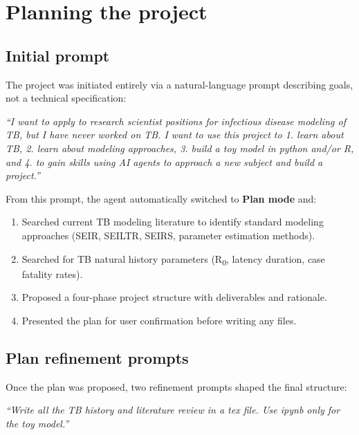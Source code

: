 \documentclass[11pt]{article}
\begin{document}
\section{Planning the project}

\subsection{Initial prompt}

The project was initiated entirely via a natural-language prompt describing goals, not a technical specification:

\begin{promptbox}
\textit{``I want to apply to research scientist positions for infectious disease modeling of TB, but I have never worked on TB. I want to use this project to 1. learn about TB, 2. learn about modeling approaches, 3. build a toy model in python and/or R, and 4. to gain skills using AI agents to approach a new subject and build a project.''}
\end{promptbox}

\noindent From this prompt, the agent automatically switched to \textbf{Plan mode} and:
\begin{enumerate}[noitemsep]
  \item Searched current TB modeling literature to identify standard modeling approaches (SEIR, SEILTR, SEIRS, parameter estimation methods).
  \item Searched for TB natural history parameters (R\textsubscript{0}, latency duration, case fatality rates).
  \item Proposed a four-phase project structure with deliverables and rationale.
  \item Presented the plan for user confirmation before writing any files.
\end{enumerate}

\subsection{Plan refinement prompts}

Once the plan was proposed, two refinement prompts shaped the final structure:

\begin{promptbox}
\textit{``Write all the TB history and literature review in a tex file. Use ipynb only for the toy model.''}
\end{promptbox}
\end{document}
